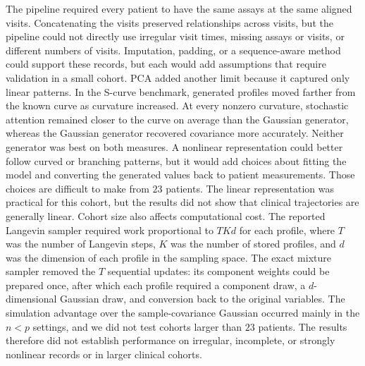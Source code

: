 The pipeline required every patient to have the same assays at the same aligned visits.
Concatenating the visits preserved relationships across visits, but the pipeline could not
directly use irregular visit times, missing assays or visits, or different numbers of visits.
Imputation, padding, or a sequence-aware method could support these records, but each would
add assumptions that require validation in a small cohort.
PCA added another limit because it captured only linear patterns. In the S-curve
benchmark, generated profiles moved farther from the known curve as curvature increased.
At every nonzero curvature, stochastic attention remained closer to the curve on average
than the Gaussian generator, whereas the Gaussian generator recovered covariance more
accurately. Neither generator was best on both measures. A nonlinear representation could
better follow curved or branching patterns, but it would add choices about fitting the model
and converting the generated values back to patient measurements. Those choices are
difficult to make from $23$ patients. The linear representation was practical for this
cohort, but the results did not show that clinical trajectories are generally linear.
Cohort size also affects computational cost. The reported Langevin sampler required
work proportional to $TKd$ for each profile, where $T$ was the number of Langevin steps,
$K$ was the number of stored profiles, and $d$ was the dimension of each profile in the
sampling space. The exact mixture sampler removed the $T$ sequential updates: its component
weights could be prepared once, after which each profile
required a component draw, a $d$-dimensional Gaussian draw, and conversion back to the
original variables. The simulation advantage over the sample-covariance Gaussian occurred
mainly in the $n<p$ settings, and we did not test cohorts larger than $23$ patients.
The results therefore did not establish performance on irregular, incomplete, or
strongly nonlinear records or in larger clinical cohorts.

